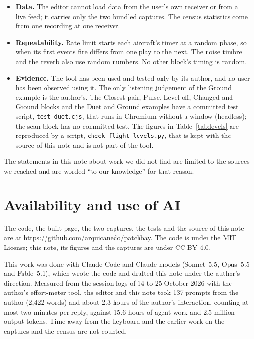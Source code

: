 \documentclass[11pt,letterpaper]{article}
\begin{document}
\begin{itemize}
\item \textbf{Data.} The editor cannot load data from the user's own receiver or from a live feed; it carries only the two bundled captures. The census statistics come from one recording at one receiver.
\item \textbf{Repeatability.} Rate limit starts each aircraft's timer at a random phase, so when its first events fire differs from one play to the next. The noise timbre and the reverb also use random numbers. No other block's timing is random.
\item \textbf{Evidence.} The tool has been used and tested only by its author, and no user has been observed using it. The only listening judgement of the Ground example is the author's. The Closest pair, Pulse, Level-off, Changed and Ground blocks and the Duet and Ground examples have a committed test script, \texttt{test-duet.cjs}, that runs in Chromium without a window (headless); the scan block has no committed test. The figures in Table~\ref{tab:levels} are reproduced by a script, \texttt{check\_flight\_levels.py}, that is kept with the source of this note and is not part of the tool.
\end{itemize}
The statements in this note about work we did not find are limited to the sources we reached and are worded ``to our knowledge'' for that reason.

\section{Availability and use of AI}

The code, the built page, the two captures, the tests and the source of this note are at \url{https://github.com/arquicanedo/patchbay}. The code is under the MIT License; this note, its figures and the captures are under CC BY 4.0.

This work was done with Claude Code and Claude models (Sonnet~5.5, Opus~5.5 and Fable~5.1), which wrote the code and drafted this note under the author's direction. Measured from the session logs of 14 to 25 October 2026 with the author's effort-meter tool, the editor and this note took 137 prompts from the author (2,422 words) and about 2.3 hours of the author's interaction, counting at most two minutes per reply, against 15.6 hours of agent work and 2.5 million output tokens. Time away from the keyboard and the earlier work on the captures and the census are not counted.



\end{document}
